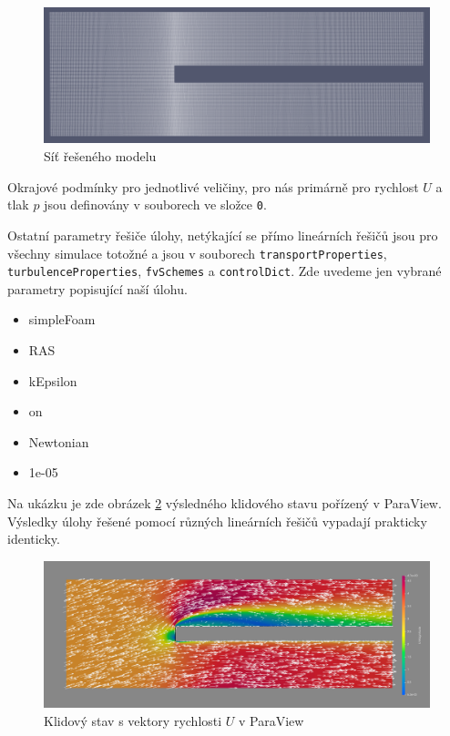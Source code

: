 \documentclass[a4paper,12pt]{report}
\theoremstyle{remark}
\begin{document}
\begin{figure}[H]
	\centering
	\includegraphics[width=1\linewidth]{pv-mesh.png}
	\caption{Síť řešeného modelu}
	\label{fig:pvmesh}
\end{figure}


Okrajové podmínky pro jednotlivé veličiny, pro nás primárně pro rychlost $U$ a tlak $p$  jsou definovány v souborech ve složce \texttt{0}.

Ostatní parametry řešiče úlohy, netýkající se přímo lineárních řešičů jsou pro všechny simulace totožné a jsou v souborech \texttt{transportProperties}, \texttt{turbulenceProperties}, \texttt{fvSchemes} a \texttt{controlDict}. Zde uvedeme jen vybrané parametry popisující naší úlohu.

\begin{itemize}
	\item{simpleFoam}
	\item{RAS}
	\item{kEpsilon}
	\item{on}
	\item{Newtonian}
	\item{1e-05}
\end{itemize}


	
Na ukázku je zde obrázek \ref{fig:pv-GAMG-GS} výsledného klidového stavu pořízený v ParaView. Výsledky úlohy řešené pomocí různých lineárních řešičů vypadají prakticky identicky.
	
	 \begin{figure}[H]
		\centering
		\includegraphics[width=1\linewidth]{pv-GAMG-GS.png}
		\caption{Klidový stav s vektory rychlosti $U$ v ParaView}
		\label{fig:pv-GAMG-GS}
	\end{figure}
\end{document}

